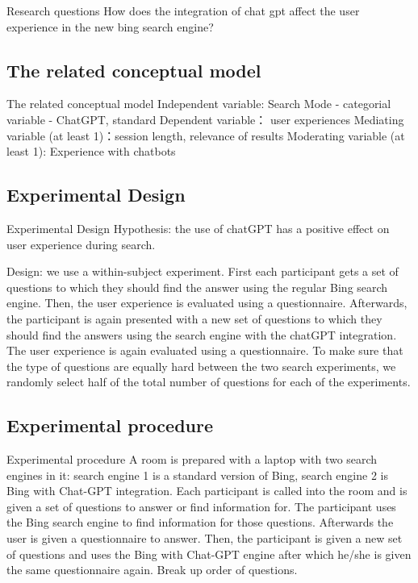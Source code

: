 \documentclass[
  ignorenonframetext,
]{beamer}
\begin{document}
\begin{frame}{Research questions}
How does the integration of chat gpt affect the user experience in the
new bing search engine?
\end{frame}

\hypertarget{the-related-conceptual-model}{%
\subsection{The related conceptual
model}\label{the-related-conceptual-model}}

\begin{frame}{The related conceptual model}
Independent variable: Search Mode - categorial variable - ChatGPT,
standard Dependent variable： user experiences Mediating variable (at
least 1)：session length, relevance of results Moderating variable (at
least 1): Experience with chatbots
\end{frame}

\hypertarget{experimental-design}{%
\subsection{Experimental Design}\label{experimental-design}}

\begin{frame}{Experimental Design}
Hypothesis: the use of chatGPT has a positive effect on user experience
during search.

Design: we use a within-subject experiment. First each participant gets
a set of questions to which they should find the answer using the
regular Bing search engine. Then, the user experience is evaluated using
a questionnaire. Afterwards, the participant is again presented with a
new set of questions to which they should find the answers using the
search engine with the chatGPT integration. The user experience is again
evaluated using a questionnaire. To make sure that the type of questions
are equally hard between the two search experiments, we randomly select
half of the total number of questions for each of the experiments.
\end{frame}

\hypertarget{experimental-procedure}{%
\subsection{Experimental procedure}\label{experimental-procedure}}

\begin{frame}{Experimental procedure}
A room is prepared with a laptop with two search engines in it: search
engine 1 is a standard version of Bing, search engine 2 is Bing with
Chat-GPT integration. Each participant is called into the room and is
given a set of questions to answer or find information for. The
participant uses the Bing search engine to find information for those
questions. Afterwards the user is given a questionnaire to answer. Then,
the participant is given a new set of questions and uses the Bing with
Chat-GPT engine after which he/she is given the same questionnaire
again. Break up order of questions.
\end{frame}
\end{document}
